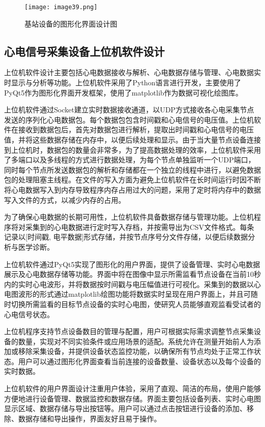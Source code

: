 \begin{figure}[htb]
    \centering
    \texttt{[image: image39.png]}
    \caption{基站设备的图形化界面设计图}
    \label{F.ECG_image39}
\end{figure}

\subsection{心电信号采集设备上位机软件设计}

上位机软件设计主要包括心电数据接收与解析、心电数据存储与管理、心电数据实时显示与分析等功能。上位机软件采用了Python语言进行开发，主要使用了PyQt5作为图形化界面开发框架，使用了matplotlib作为数据可视化绘图库。\cite{基于人工智能的生成式心电数据增强方法研究综述}

上位机软件通过Socket建立实时数据接收通道，以UDP方式接收各心电采集节点发送的序列化心电数据包。每个数据包包含时间戳和心电信号的电压值。上位机软件在接收到数据包后，首先对数据包进行解析，提取出时间戳和心电信号的电压值，并将这些数据存储在内存中，以便后续处理和显示。由于当大量节点设备连接到上位机时，数据包的数量会非常多，为了提高数据处理的效率，上位机软件采用了多端口以及多线程的方式进行数据处理，为每个节点单独监听一个UDP端口，同时每个节点所发送数据包的解析和存储都在一个独立的线程中进行，以避免数据包的处理阻塞主线程。在文件的写入方面为避免上位机软件在长时间运行时因不断将心电数据写入到内存导致程序内存占用过大的问题，采用了定时将内存中的数据写入文件的方式，以减少内存的占用。

为了确保心电数据的长期可用性，上位机软件具备数据存储与管理功能。上位机程序将对采集到的心电数据进行定时写入存档，并按需导出为CSV文件格式。每条记录以[时间戳, 电平数据]形式存储，并按节点序号分文件存储，以便后续数据分析与医学诊断。

上位机软件通过PyQt5实现了图形化的用户界面，提供了设备管理、实时心电数据展示及心电数据存储等功能。界面中将在图像中显示所需监看节点设备在当前10秒内的实时心电波形，并将数据按时间戳与电压幅值进行可视化。采集到的数据以心电图波形的形式通过matplotlib绘图功能将数据实时呈现在用户界面上，并且可随时切换所需监看的目标节点设备的实时心电图，使研究人员能够直观监看受试者的心电信号状态。

上位机程序支持节点设备数目的管理与配置，用户可根据实际需求调整节点采集设备的数量，实现对不同实验条件或应用场景的适配。系统允许在测量开始前人为添加或移除采集设备，并提供设备状态监控功能，以确保所有节点均处于正常工作状态。用户可以通过图形化界面查看当前连接的设备数量、设备状态以及每个设备的实时数据。

上位机软件的用户界面设计注重用户体验，采用了直观、简洁的布局，使用户能够方便地进行设备管理、数据监控和数据存储。界面主要包括设备列表、实时心电图显示区域、数据存储与导出按钮等。用户可以通过点击按钮进行设备的添加、移除、数据存储和导出操作，界面友好且易于操作。

